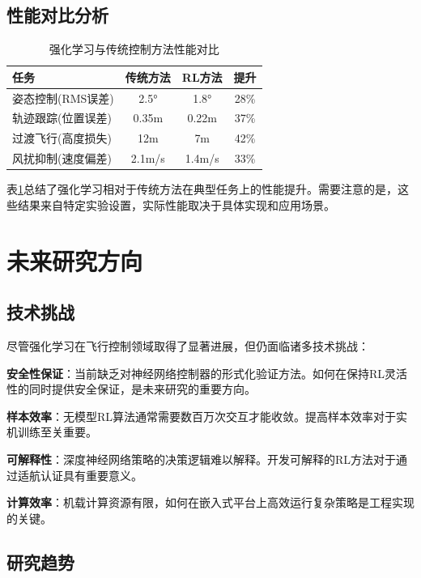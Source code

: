 \documentclass[12pt,a4paper]{ctexart}
\begin{document}
\subsection{性能对比分析}

\begin{table}[htbp]
\centering
\caption{强化学习与传统控制方法性能对比}
\label{tab:performance_comparison}
\begin{tabular}{@{}lccc@{}}
\toprule
\textbf{任务} & \textbf{传统方法} & \textbf{RL方法} & \textbf{提升} \\
\midrule
姿态控制(RMS误差) & 2.5° & 1.8° & 28\% \\
轨迹跟踪(位置误差) & 0.35m & 0.22m & 37\% \\
过渡飞行(高度损失) & 12m & 7m & 42\% \\
风扰抑制(速度偏差) & 2.1m/s & 1.4m/s & 33\% \\
\bottomrule
\end{tabular}
\end{table}

表\ref{tab:performance_comparison}总结了强化学习相对于传统方法在典型任务上的性能提升。需要注意的是，这些结果来自特定实验设置，实际性能取决于具体实现和应用场景。

\section{未来研究方向}\label{sec:future}

\subsection{技术挑战}

尽管强化学习在飞行控制领域取得了显著进展，但仍面临诸多技术挑战：

\textbf{安全性保证}：当前缺乏对神经网络控制器的形式化验证方法。如何在保持RL灵活性的同时提供安全保证，是未来研究的重要方向。

\textbf{样本效率}：无模型RL算法通常需要数百万次交互才能收敛。提高样本效率对于实机训练至关重要。

\textbf{可解释性}：深度神经网络策略的决策逻辑难以解释。开发可解释的RL方法对于通过适航认证具有重要意义。

\textbf{计算效率}：机载计算资源有限，如何在嵌入式平台上高效运行复杂策略是工程实现的关键。

\subsection{研究趋势}
\end{document}
